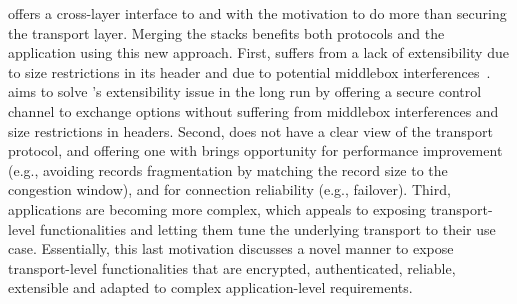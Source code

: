 \label{sec:background-design}


\tcpls offers a cross-layer interface to \tls and \tcp
with the motivation to do more than securing the transport layer. Merging the
stacks benefits both
protocols
and the application using this new approach. First, \tcp suffers from a lack of
extensibility due to size restrictions in its header and due to
potential middlebox interferences~\cite{honda2011still}. \tcpls aims to solve
\tcp's extensibility issue in the long run by offering a secure control channel
to exchange \tcp options without suffering from middlebox interferences and size restrictions in \tcp headers.
Second, \tls does not have a clear view of the transport protocol, and offering
one with \tcpls brings opportunity for performance improvement (e.g., avoiding
records fragmentation by matching the record size to the congestion window), and
for connection reliability (e.g., failover).  Third, applications are becoming
more complex, which appeals to exposing transport-level
functionalities and letting them tune the underlying transport to their use case.
Essentially, this last motivation discusses a novel manner to expose
transport-level functionalities that are encrypted, authenticated, reliable,
extensible and adapted to complex application-level requirements.


